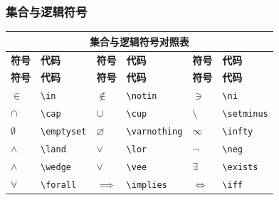 \documentclass{article}
\begin{document}
\subsubsection{集合与逻辑符号}
\begin{longtable}{|p{1.5cm}|p{2cm}|p{1.5cm}|p{2cm}|p{1.5cm}|p{2cm}|}
      \hline
      \multicolumn{6}{|c|}{\textbf{集合与逻辑符号对照表}}                                                            \\
      \hline
      \textbf{符号} & \textbf{代码}      & \textbf{符号}   & \textbf{代码}        & \textbf{符号} & \textbf{代码}      \\
      \hline
      \endfirsthead
      \hline
      \textbf{符号} & \textbf{代码}      & \textbf{符号}   & \textbf{代码}        & \textbf{符号} & \textbf{代码}      \\
      \hline
      \endhead
      $\in$       & \verb|\in|       & $\notin$      & \verb|\notin|      & $\ni$       & \verb|\ni|       \\
      $\cap$      & \verb|\cap|      & $\cup$        & \verb|\cup|        & $\setminus$ & \verb|\setminus| \\
      $\emptyset$ & \verb|\emptyset| & $\varnothing$ & \verb|\varnothing| & $\infty$    & \verb|\infty|    \\
      $\land$     & \verb|\land|     & $\lor$        & \verb|\lor|        & $\neg$      & \verb|\neg|      \\
      $\wedge$    & \verb|\wedge|    & $\vee$        & \verb|\vee|        & $\exists$   & \verb|\exists|   \\
      $\forall$   & \verb|\forall|   & $\implies$    & \verb|\implies|    & $\iff$      & \verb|\iff|      \\
      \hline
\end{longtable}
\end{document}
